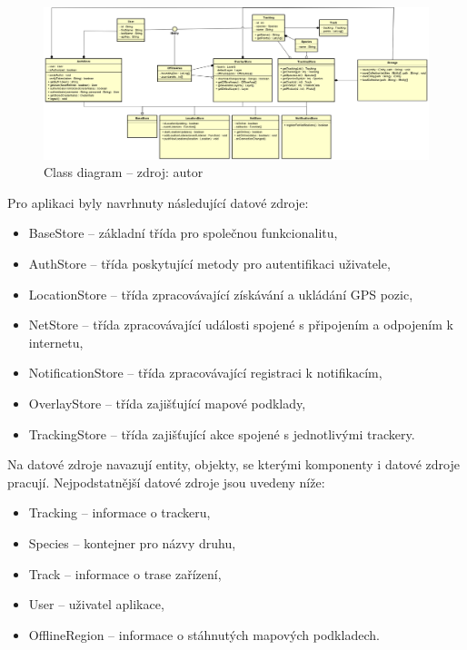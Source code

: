\begin{figure}[H]
	\begin{center}
		\includegraphics[width=145mm]{img/classdiagram.png}
	\end{center}
	\caption[Class diagram datových zdrojů a entit]{Class diagram -- zdroj: autor}
\end{figure}

Pro aplikaci byly navrhnuty následující datové zdroje:

\begin{itemize}
	\item BaseStore -- základní třída pro společnou funkcionalitu,
	\item AuthStore -- třída poskytující metody pro autentifikaci uživatele,
	\item LocationStore -- třída zpracovávající získávání a ukládání GPS pozic,
	\item NetStore -- třída zpracovávající události spojené s připojením a odpojením k internetu,
	\item NotificationStore -- třída zpracovávající registraci k notifikacím,
	\item OverlayStore -- třída zajišťující mapové podklady,
	\item TrackingStore -- třída zajišťující akce spojené s jednotlivými trackery.
\end{itemize}

Na datové zdroje navazují entity, objekty, se kterými komponenty i datové zdroje pracují. Nejpodstatnější datové zdroje jsou uvedeny níže:

\begin{itemize}
	\item Tracking -- informace o trackeru,
	\item Species -- kontejner pro názvy druhu,
	\item Track -- informace o trase zařízení,
	\item User -- uživatel aplikace,
	\item OfflineRegion -- informace o stáhnutých mapových podkladech.
\end{itemize}

